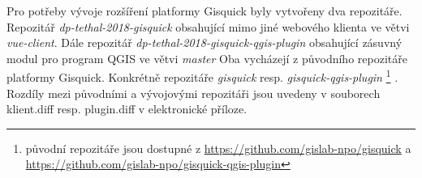 \newpage
Pro potřeby vývoje rozšíření platformy Gisquick byly vytvořeny dva repozitáře. 
Repozitář \textit{dp-tethal-2018-gisquick}
obsahující mimo jiné webového klienta ve větvi \textit{vue-client}.
Dále repozitář \textit{dp-tethal-2018-gisquick-qgis-plugin} obsahující zásuvný 
modul pro program QGIS ve větvi \textit{master}
Oba vycházejí z původního repozitáře platformy Gisquick. Konkrétně 
repozitáře \textit{gisquick} resp. \textit{gisquick-qgis-plugin}
\footnote{původní repozitáře jsou dostupné z \url{https://github.com/gislab-npo/gisquick} a \newline \url{https://github.com/gislab-npo/gisquick-qgis-plugin}}
.
\newline
Rozdíly mezi původními a vývojovými repozitáři jsou uvedeny v 
souborech klient.diff resp. plugin.diff v elektronické příloze. 


